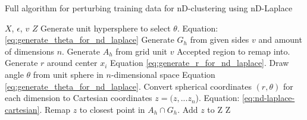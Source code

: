 \begin{algorithm}[H]
   \caption{Full algorithm for perturbing training data for nD-clustering using nD-Laplace}
   \begin{algorithmic}
      \Require $X$,  $\epsilon$, $v$ 
      \Ensure $Z$ 
      \State Generate unit hypersphere to select $\theta$. \Comment Equation: \ref{eq:generate_theta_for_nd_laplace}
      \State Generate $G_h$ from given sides $v$ and amount of dimensions $n$.
        \State Generate $A_h$ from grid unit $v$ \Comment Accepted region to remap into. 
      \State Generate $r$ around center $x_i$ \Comment Equation \ref{eq:generate_r_for_nd_laplace}.
      \State Draw angle $\theta$ from unit sphere in $n$-dimensional space \Comment Equation \ref{eq:generate_theta_for_nd_laplace}.
      \State Convert spherical coordinates $(r, \theta)$ for \\ each dimension to Cartesian coordinates $z = (z, ...z_n$). \Comment Equation: \ref{eq:nd-laplace-cartesian}.
            \State Remap $z$ to closest point in $A_h \cap G_h$.
       \EndIf
      \State Add $z$ to Z
      \EndFor
      \State \Return Z
   \end{algorithmic}
   \label{alg:nd-laplace}
\end{algorithm}